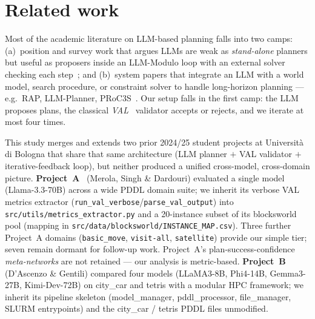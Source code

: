 
\section{Related work}
\label{sec:related}

Most of the academic literature on LLM-based planning falls into two
camps: (a)~position and survey work that argues LLMs are weak as
\emph{stand-alone} planners but useful as proposers inside an
LLM-Modulo loop with an external solver
checking each step~\cite{kambhampati2024llmmodulo,plangenllms-survey,plaat-reasoning};
and (b)~system papers that integrate an LLM with a world model, search
procedure, or constraint solver to handle long-horizon planning ---
e.g.\ RAP, LLM-Planner, PRoC3S~\cite{hao2023rap,song2023llmplanner,curtis2024proc3s}.
Our setup falls in the first camp: the LLM proposes plans, the
classical \emph{VAL}~\cite{val} validator accepts or rejects, and we
iterate at most four times.

This study merges and extends two prior 2024/25 student projects at
Università di Bologna that share that same architecture (LLM
planner $+$ VAL validator $+$ iterative-feedback loop), but neither
produced a unified cross-model, cross-domain picture.
\textbf{Project~A}~\cite{projecta} (Merola, Singh \& Dardouri)
evaluated a single model (Llama-3.3-70B) across a wide PDDL domain
suite; we inherit its verbose VAL metrics extractor
(\texttt{run\_val\_verbose}/\texttt{parse\_val\_output}) into
\texttt{src/utils/metrics\_extractor.py} and a 20-instance subset of
its blocksworld pool (mapping in
\texttt{src/data/blocksworld/INSTANCE\_MAP.csv}). Three further
Project~A domains (\texttt{basic\_move}, \texttt{visit-all},
\texttt{satellite}) provide our simple tier; seven remain dormant for
follow-up work. Project~A's plan-success-confidence \emph{meta-networks}
are not retained --- our analysis is metric-based.
\textbf{Project~B}~\cite{projectb} (D'Ascenzo \& Gentili) compared four
models (LLaMA3-8B, Phi4-14B, Gemma3-27B, Kimi-Dev-72B) on city\_car
and tetris with a modular HPC framework; we inherit its pipeline
skeleton (model\_manager, pddl\_processor, file\_manager, SLURM
entrypoints) and the city\_car / tetris PDDL files unmodified.


